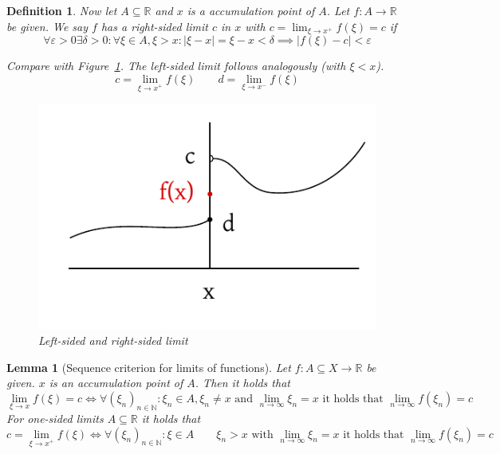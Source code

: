 \documentclass{article}
\newtheorem{definition}{Definition}  \numberwithin{definition}{section}
\newtheorem{lemma}{Lemma}  \numberwithin{lemma}{section}
\newcommand{\card}[1]{\left|#1\right|}
\begin{document}
\begin{definition} %
  Now let $A \subseteq \mathbb R$ and $x$ is a accumulation point of $A$.
  Let $f: A \to \mathbb R$ be given. We say $f$ has a right-sided limit $c$ in $x$
  with $c = \lim_{\xi \to x^+} f(\xi) = c$ if
  \[ \forall \varepsilon > 0 \exists \delta > 0: \forall \xi \in A, \xi > x: \card{\xi - x} = \xi - x < \delta \implies \card{f(\xi) - c} < \varepsilon \]

  Compare with Figure~\ref{img:def5}.
  The left-sided limit follows analogously (with $\xi < x$).
  \[ c = \lim_{\xi \to x^+} f(\xi) \qquad d = \lim_{\xi \to x^-} f(\xi) \]

  \begin{figure}[t]
    \begin{center}
      \includegraphics{img/14b_def5.pdf}
      \caption{Left-sided and right-sided limit}
      \label{img:def5}
    \end{center}
  \end{figure}
\end{definition}

\begin{lemma}[Sequence criterion for limits of functions] %
  \label{lemma5}
  Let $f: A \subseteq X \to \mathbb R$ be given. $x$ is an accumulation point of $A$.
  Then it holds that
  \[ \lim_{\xi \to x} f(\xi) = c \iff \forall (\xi_n)_{n\in\mathbb N}: \xi_n \in A, \xi_n \neq x \text{ and } \lim_{n\to\infty} \xi_n = x \text{ it holds that } \lim_{n\to\infty} f(\xi_n) = c \]
  For one-sided limits $A \subseteq \mathbb R$ it holds that
  \[ c = \lim_{\xi\to x^{+}} f(\xi) \iff \forall (\xi_n)_{n\in\mathbb N}: \xi \in A \qquad \xi_n > x \text{ with } \lim_{n\to\infty} \xi_n = x \text{ it holds that } \lim_{n\to\infty} f(\xi_n) = c \]
\end{lemma}
\end{document}

